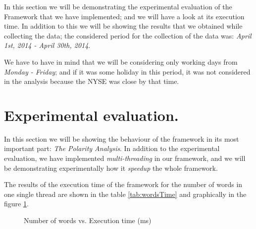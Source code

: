 In this section we will be demonstrating the experimental evaluation of the Framework that we have implemented; and we will have a look at its execution time. In addition to this we will be showing the results that we obtained while collecting the data; the considered period for the collection of the data was: \emph{April 1st, 2014 - April 30th, 2014}. 


We have to have in mind that we will be considering only working days from \emph{Monday - Friday}; and if it was some holiday in this period, it was not considered in the analysis because the NYSE was close by that time.

\section{Experimental evaluation.}

In this section we will be showing the behaviour of the framework in its most important part: \emph{The Polarity Analysis}. In addition to the experimental evaluation, we have implemented \emph{multi-threading} in our framework, and we will be demonstrating experimentally how it \emph{speedup} the whole framework.

The results of the execution time of the framework for the number of words in one single thread are shown in the table \ref{tab:wordsTime} and graphically in the figure \ref{fig:wordsTime}.

\begin{figure}\centering
	\caption{Number of words vs. Execution time (ms)}\label{fig:wordsTime}
\end{figure}

